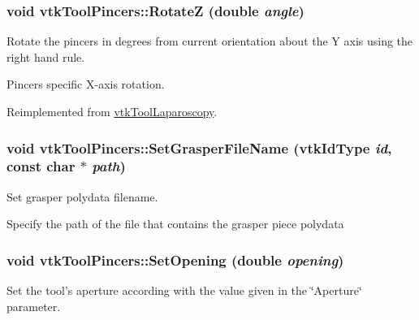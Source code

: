\hypertarget{classvtkToolPincers_ad7a4a9f0e3291b88eb4e30986784539a}{
\subsubsection[{RotateZ}]{\setlength{\rightskip}{0pt plus 5cm}void vtkToolPincers::RotateZ (double {\em angle})}}
\label{classvtkToolPincers_ad7a4a9f0e3291b88eb4e30986784539a}


Rotate the pincers in degrees from current orientation about the Y axis using the right hand rule. 

Pincers specific X-\/axis rotation. 

Reimplemented from \hyperlink{classvtkToolLaparoscopy_a3849ce4caa8283696433cb1ac0466bc5}{vtkToolLaparoscopy}.

\hypertarget{classvtkToolPincers_a478f107b430191c0e1098e938b35b975}{
\subsubsection[{SetGrasperFileName}]{\setlength{\rightskip}{0pt plus 5cm}void vtkToolPincers::SetGrasperFileName (vtkIdType {\em id}, \/  const char $\ast$ {\em path})}}
\label{classvtkToolPincers_a478f107b430191c0e1098e938b35b975}


Set grasper polydata filename. 

Specify the path of the file that contains the grasper piece polydata \hypertarget{classvtkToolPincers_a6314454d06c23e49fe1908812441658f}{
\subsubsection[{SetOpening}]{\setlength{\rightskip}{0pt plus 5cm}void vtkToolPincers::SetOpening (double {\em opening})}}
\label{classvtkToolPincers_a6314454d06c23e49fe1908812441658f}


Set the tool's aperture according with the value given in the \char`\"{}Aperture\char`\"{} parameter. 

